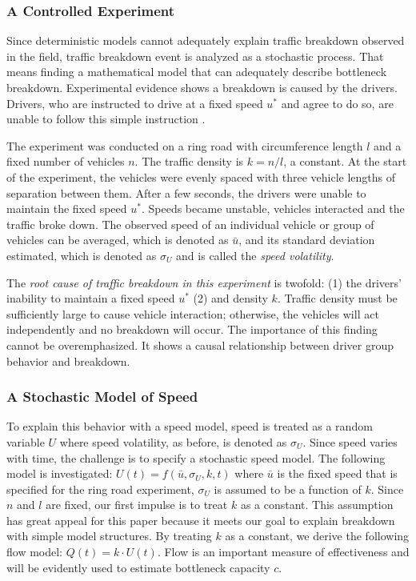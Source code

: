 \documentclass[Proceedings]{ascelike}
\begin{document}
\subsubsection{A Controlled Experiment}

Since deterministic models cannot  adequately explain traffic breakdown observed in the field,  traffic breakdown event is analyzed as a stochastic process.   That means finding a  mathematical model that can adequately describe bottleneck breakdown. Experimental evidence shows  a breakdown is caused by  the drivers. Drivers, who are instructed to drive at a fixed speed $u^*$ and agree to do so, are unable to follow this simple instruction \cite{1367-2630-10-3-033001}. 

The experiment was conducted on a ring  road with circumference length $l$ and  a fixed number of  vehicles  $n$. The traffic density is $k = n/l$, a constant. At the start of the experiment, the vehicles were evenly spaced with three vehicle lengths of separation between them. After a few seconds, the drivers were unable to maintain the fixed speed $u^*$. Speeds became unstable, vehicles interacted and the traffic broke down.  The observed speed of an individual vehicle or group of vehicles can be averaged, which is denoted as $\bar{u}$, and its standard deviation estimated, which is denoted as $\sigma_U$ and is called the \emph{speed volatility}.  

The \emph{root cause of traffic breakdown in this experiment} is twofold: (1) the drivers' inability to maintain  a fixed speed $u^*$ (2) and density $k$. Traffic density must be sufficiently large to cause vehicle interaction; otherwise, the vehicles will act independently and no breakdown will occur. The importance of this finding cannot be overemphasized. It shows a causal relationship between driver group behavior and breakdown.

\subsubsection{A Stochastic Model of Speed}

To explain this behavior with a speed model, speed is treated as a random variable $U$ where speed volatility, as before, is denoted as $\sigma_U$.  Since speed varies with time, the challenge is  to specify a stochastic speed model. The following model is investigated: $U(t) = f(\bar{u},\sigma_U,k,t)$ where $\bar{u}$ is the fixed speed that is specified for the ring road experiment, $\sigma_U$ is assumed to be a function of $k$. Since $n$ and $l$ are fixed, our first impulse is to treat $k$ as a constant. This assumption has great appeal for this paper because it meets our goal to explain breakdown with simple model structures. By treating  $k$ as a constant,  we derive the following flow model: $Q(t) = k \cdot U(t)$. Flow is an important measure of effectiveness and will be evidently used to estimate bottleneck capacity $c$.
\end{document}
